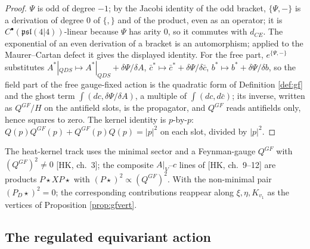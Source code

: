\begin{proof}
$\Psi$ is odd of degree $-1$; by the Jacobi identity of the odd bracket, $\{\Psi,-\}$ is a derivation of degree $0$ of $\{,\}$ and of the product, even as an operator; it is $C^\bullet(\mathfrak{psl}(4|4))$-linear because $\Psi$ has arity $0$, so it commutes with $d_{CE}$. The exponential of an even derivation of a bracket is an automorphism; applied to the Maurer--Cartan defect it gives the displayed identity. For the free part, $e^{\{\Psi,-\}}$ substitutes $A^*|_{QDS}\mapsto A^*|_{QDS}+\delta\Psi/\delta A$, $\bar c^*\mapsto\bar c^*+\delta\Psi/\delta\bar c$, $b^*\mapsto b^*+\delta\Psi/\delta b$, so the field part of the free gauge-fixed action is the quadratic form of Definition \ref{def:gf} and the ghost term $\int(dc,\delta\Psi/\delta A)$, a multiple of $\int(dc,d\bar c)$; its inverse, written as $Q^{GF}/H$ on the antifield slots, is the propagator, and $Q^{GF}$ reads antifields only, hence squares to zero. The kernel identity is $p$-by-$p$: $Q(p)Q^{GF}(p)+Q^{GF}(p)Q(p)=|p|^2$ on each slot, divided by $|p|^2$.
\end{proof}

\begin{remark}
The heat-kernel track uses the minimal sector and a Feynman-gauge $Q^{GF}$ with $(Q^{GF})^2\neq0$ [HK, ch.~3]; the composite $A|_V$--$c$ lines of [HK, ch.~9--12] are products $P\star X P\star$ with $(P\star)^2\propto(Q^{GF})^2$. With the non-minimal pair $(P_D\star)^2=0$; the corresponding contributions reappear along $\xi,\eta,K_{v_1}$ as the vertices of Proposition \ref{prop:gfvert}.
\end{remark}

\subsection{The regulated equivariant action}

